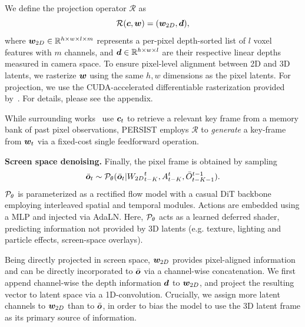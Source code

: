 \documentclass{article}
\theoremstyle{plain}
\theoremstyle{definition}
\theoremstyle{remark}
\begin{document}
We define the projection operator $\mathcal{R}$ as 
\begin{equation}
    \mathcal{R}({\bm{c}}, {\bm{w}}) = ({\bm{w}}_{2D}, {\bm{d}}), 
\end{equation}
where ${\bm{w}}_{2D}  \in \mathbb{R}^{h \times w \times l \times m}$  represents a per-pixel depth-sorted list of $l$ voxel features with $m$ channels, and ${\bm{d}} \in \mathbb{R}^{h \times w \times l}$ are their respective linear depths measured in camera space. To ensure pixel-level alignment between 2D and 3D latents, we rasterize ${\bm{w}}$ using the same $h,w$ dimensions as the pixel latents. For projection, we use the CUDA-accelerated differentiable rasterization 
provided by~\citep{Laine2020diffrast}. For details, please see the appendix.
 


While surrounding works~\cite{xiao2025worldmem,huang2025memory} use ${\bm{c}}_t$ to retrieve a relevant key frame from a memory bank of past pixel observations, PERSIST employs $\mathcal{R}$ to \textit{generate} a key-frame from ${\bm{w}}_t$ via a fixed-cost single feedforward operation.

\textbf{Screen space denoising.}
Finally, the pixel frame is obtained by sampling
\begin{equation}
    \bar{{\bm{o}}}_t \sim {\mathcal{P}}_\theta (\bar{{\bm{o}}}_t | {W_{2D}}_{t-K}^{t}, A^t_{t-K}, \bar{O}^{t-1}_{t-K-1}).
\end{equation}
${\mathcal{P}}_\theta$ is parameterized as a rectified flow model with a casual DiT backbone employing interleaved spatial and temporal modules. Actions are embedded using a MLP and injected via AdaLN. Here, ${\mathcal{P}}_\theta$ acts as a learned deferred shader, predicting information not provided by 3D latents (e.g. texture, lighting and particle effects, screen-space overlays).

Being directly projected in screen space, ${\bm{w}}_{2D}$ provides pixel-aligned information and can be  directly incorporated to $\bar{{\bm{o}}}$ via a channel-wise concatenation. We first append channel-wise the depth information ${\bm{d}}$ to ${\bm{w}}_{2D}$, and project the resulting vector to latent space via a 1D-convolution. Crucially, we assign more latent channels to ${\bm{w}}_{2D}$ than to $\bar{{\bm{o}}}$, in order to bias the model to use the 3D latent frame as its primary source of information.
\end{document}
